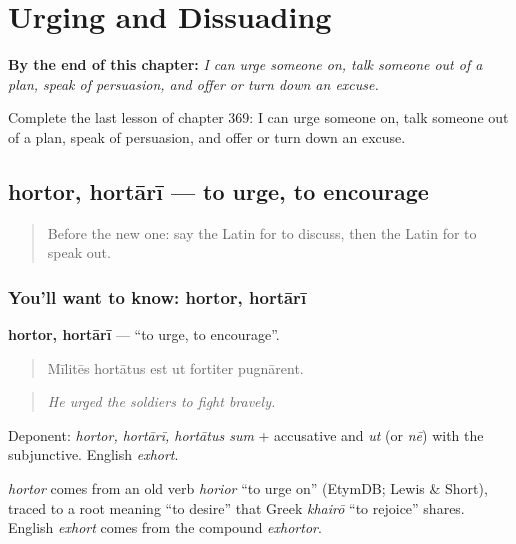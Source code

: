 
\chapter{Urging and Dissuading}
\label{ch:la-urging-and-dissuading}

\begin{chapteropening}
\textbf{By the end of this chapter:} \emph{I can urge someone on, talk someone out of a plan, speak of persuasion, and offer or turn down an excuse.}

Complete the last lesson of chapter 369: I can urge someone on, talk someone out of a plan, speak of persuasion, and offer or turn down an excuse.
\end{chapteropening}

\section[hortor, hortārī]{hortor, hortārī — to urge, to encourage}

\label{lesson:LA-C369-hortor}



\begin{quote}
Before the new one: say the Latin for to discuss, then the Latin for to speak out.
\end{quote}

\subsection*{You'll want to know: hortor, hortārī}
\textbf{hortor, hortārī} — \textquotedblleft{}to urge, to encourage\textquotedblright{}.

\begin{quote}
Mīlitēs hortātus est ut fortiter pugnārent.
\end{quote}

\begin{quote}
\emph{He urged the soldiers to fight bravely.}
\end{quote}

Deponent: \emph{hortor, hortārī, hortātus sum} + accusative and \emph{ut} (or \emph{nē}) with the subjunctive. English \emph{exhort}.

\begin{cousinweb}
\emph{hortor} comes from an old verb \emph{horior} \textquotedblleft{}to urge on\textquotedblright{} (EtymDB; Lewis \& Short), traced to a root meaning \textquotedblleft{}to desire\textquotedblright{} that Greek \emph{khairō} \textquotedblleft{}to rejoice\textquotedblright{} shares. English \emph{exhort} comes from the compound \emph{exhortor}.
\end{cousinweb}

